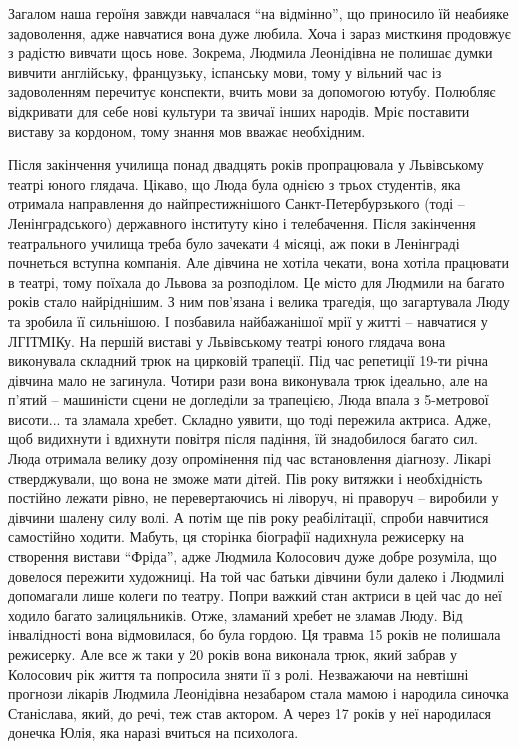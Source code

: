 
Загалом наша героїня завжди
навчалася \enquote{на відмінно}, що приносило їй неабияке задоволення, адже навчатися
вона дуже любила. Хоча і зараз мисткиня продовжує з радістю вивчати щось нове.
Зокрема, Людмила Леонідівна не полишає думки вивчити англійську, французьку,
іспанську мови, тому у вільний час із задоволенням перечитує конспекти, вчить
мови за допомогою ютубу. Полюбляє відкривати для себе нові культури та звичаї
інших народів. Мріє поставити виставу за кордоном, тому знання мов вважає
необхідним.

Після закінчення училища понад двадцять років пропрацювала у Львівському театрі
юного глядача. Цікаво, що Люда була однією з трьох студентів, яка отримала
направлення до найпрестижнішого Санкт-Петербурзького (тоді – Ленінградського)
державного інституту кіно і телебачення. Після закінчення театрального училища
треба було зачекати 4 місяці, аж поки в Ленінграді почнеться вступна компанія.
Але дівчина не хотіла чекати, вона хотіла працювати в театрі, тому поїхала до
Львова за розподілом. Це місто для Людмили на багато років стало найріднішим. З
ним пов'язана і велика трагедія, що загартувала Люду та зробила її сильнішою. І
позбавила найбажанішої мрії у житті – навчатися у ЛГІТМІКу. На першій виставі у
Львівському театрі юного глядача вона виконувала складний трюк на цирковій
трапеції. Під час репетиції 19-ти річна дівчина мало не загинула. Чотири рази
вона виконувала трюк ідеально, але на п'ятий – машиністи сцени не догледіли за
трапецією, Люда впала з 5-метрової висоти... та зламала хребет. Складно уявити,
що тоді пережила актриса.  Адже, щоб видихнути і вдихнути повітря після
падіння, їй знадобилося багато сил. Люда отримала велику дозу опромінення під
час встановлення діагнозу. Лікарі стверджували, що вона не зможе мати дітей.
Пів року витяжки і необхідність постійно лежати рівно, не перевертаючись ні
ліворуч, ні праворуч – виробили у дівчини шалену силу волі. А потім ще пів року
реабілітації, спроби навчитися самостійно ходити. Мабуть, ця сторінка біографії
надихнула режисерку на створення вистави \enquote{Фріда}, адже Людмила Колосович дуже
добре розуміла, що довелося пережити художниці. На той час батьки дівчини були
далеко і Людмилі допомагали лише колеги по театру. Попри важкий стан актриси в
цей час до неї ходило багато залицяльників. Отже, зламаний хребет не зламав
Люду. Від інвалідності вона відмовилася, бо була гордою. Ця травма 15 років не
полишала режисерку. Але все  ж таки у 20 років вона виконала трюк, який забрав
у Колосович рік життя та попросила зняти її з ролі. Незважаючи на невтішні
прогнози лікарів Людмила Леонідівна незабаром стала мамою і народила синочка
Станіслава, який, до речі, теж став актором. А через 17 років у неї народилася
донечка Юлія, яка наразі вчиться на психолога.

